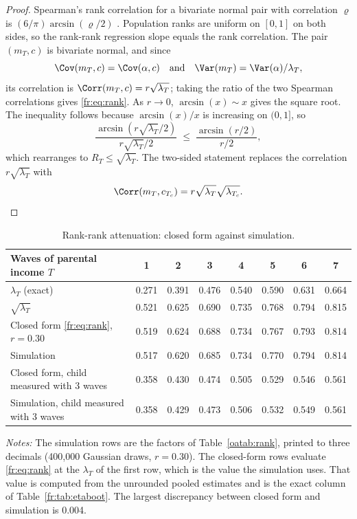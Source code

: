 \begin{proof}\sloppy
Spearman's rank correlation for a bivariate normal pair with correlation
$\varrho$ is $(6/\pi)\arcsin(\varrho/2)$ \citep{Pearson1907, Kruskal1958}.
Population ranks are uniform on $[0,1]$ on both sides, so the rank-rank
regression slope equals the rank correlation. The pair $(m_T, c)$ is
bivariate normal, and since
\[
\Cov(m_T, c) = \Cov(\alpha, c) \quad\text{and}\quad \Var(m_T) = \Var(\alpha)/\lambda_T,
\]
its correlation is $\Corr(m_T, c) = r\sqrt{\lambda_T}$; taking the ratio of
the two Spearman correlations gives \eqref{fr:eq:rank}. As $r \to 0$,
$\arcsin(x) \sim x$ gives the square root. The inequality follows because
$\arcsin(x)/x$ is increasing on $(0,1]$, so
\[
\frac{\arcsin(r\sqrt{\lambda_T}/2)}{r\sqrt{\lambda_T}/2} \;\le\; \frac{\arcsin(r/2)}{r/2},
\]
which rearranges to $R_T \le \sqrt{\lambda_T}$. The two-sided statement replaces
the correlation $r\sqrt{\lambda_T}$ with
\[
\Corr(m_T, c_{T_c}) = r\sqrt{\lambda_T}\sqrt{\lambda_{T_c}}.
\]
\end{proof}

\begin{table}[!htb]
\centering
\small
\caption{Rank-rank attenuation: closed form against simulation.}
\label{fr:tab:rank}
\begin{tabular}{@{}lccccccc@{}}
\toprule
Waves of parental income $T$ & 1 & 2 & 3 & 4 & 5 & 6 & 7 \\
\midrule
$\lambda_T$ (exact) & 0.271 & 0.391 & 0.476 & 0.540 & 0.590 & 0.631 & 0.664 \\
$\sqrt{\lambda_T}$ & 0.521 & 0.625 & 0.690 & 0.735 & 0.768 & 0.794 & 0.815 \\
Closed form \eqref{fr:eq:rank}, $r = 0.30$ & 0.519 & 0.624 & 0.688 & 0.734 & 0.767 & 0.793 & 0.814 \\
Simulation & 0.517 & 0.620 & 0.685 & 0.734 & 0.770 & 0.794 & 0.814 \\
\midrule
Closed form, child measured with 3 waves & 0.358 & 0.430 & 0.474 & 0.505 & 0.529 & 0.546 & 0.561 \\
Simulation, child measured with 3 waves & 0.358 & 0.429 & 0.473 & 0.506 & 0.532 & 0.549 & 0.561 \\
\bottomrule
\end{tabular}
\par\smallskip
\begin{minipage}{0.95\textwidth}
\footnotesize\emph{Notes:} The simulation rows are the factors of Table~\ref{oatab:rank}, printed to three decimals (400,000
Gaussian draws, $r = 0.30$). The
closed-form rows evaluate \eqref{fr:eq:rank} at the $\lambda_T$ of the first
row, which is the value the simulation uses. That value is computed from the unrounded pooled estimates and is the exact column of Table~\ref{fr:tab:etaboot}. The largest discrepancy between closed form and simulation is
0.004.
\end{minipage}
\end{table}

